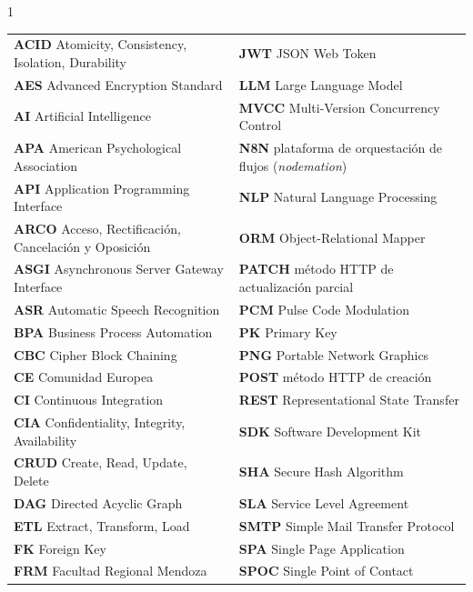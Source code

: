 \begin{spacing}{1}
\small
\setlength{\tabcolsep}{4pt}
\noindent\begin{tabular}{@{}>{\raggedright\arraybackslash}p{}@{\hspace{0.05\textwidth}}>{\raggedright\arraybackslash}p{}@{}}
\textbf{ACID} Atomicity, Consistency, Isolation, Durability & \textbf{JWT} JSON Web Token \\
\textbf{AES} Advanced Encryption Standard & \textbf{LLM} Large Language Model \\
\textbf{AI} Artificial Intelligence & \textbf{MVCC} Multi-Version Concurrency Control \\
\textbf{APA} American Psychological Association & \textbf{N8N} plataforma de orquestación de flujos (\emph{nodemation}) \\
\textbf{API} Application Programming Interface & \textbf{NLP} Natural Language Processing \\
\textbf{ARCO} Acceso, Rectificación, Cancelación y Oposición & \textbf{ORM} Object-Relational Mapper \\
\textbf{ASGI} Asynchronous Server Gateway Interface & \textbf{PATCH} método HTTP de actualización parcial \\
\textbf{ASR} Automatic Speech Recognition & \textbf{PCM} Pulse Code Modulation \\
\textbf{BPA} Business Process Automation & \textbf{PK} Primary Key \\
\textbf{CBC} Cipher Block Chaining & \textbf{PNG} Portable Network Graphics \\
\textbf{CE} Comunidad Europea & \textbf{POST} método HTTP de creación \\
\textbf{CI} Continuous Integration & \textbf{REST} Representational State Transfer \\
\textbf{CIA} Confidentiality, Integrity, Availability & \textbf{SDK} Software Development Kit \\
\textbf{CRUD} Create, Read, Update, Delete & \textbf{SHA} Secure Hash Algorithm \\
\textbf{DAG} Directed Acyclic Graph & \textbf{SLA} Service Level Agreement \\
\textbf{ETL} Extract, Transform, Load & \textbf{SMTP} Simple Mail Transfer Protocol \\
\textbf{FK} Foreign Key & \textbf{SPA} Single Page Application \\
\textbf{FRM} Facultad Regional Mendoza & \textbf{SPOC} Single Point of Contact \\

\end{tabular}
\end{spacing}
